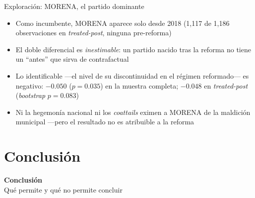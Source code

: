 \documentclass[
  aspectratio=43,        %
  t,                     %
  10pt                   %
]{beamer}
\begin{document}
\begin{frame}{Exploración: MORENA, el partido dominante}

  \begin{itemize}
    \item Como incumbente, MORENA aparece solo desde 2018
          (\textcolor{ITAMmaroon}{1{,}117 de 1{,}186} observaciones en
          \emph{treated-post}, ninguna pre-reforma)
    \item El doble diferencial es \emph{inestimable}: un partido nacido tras la
          reforma no tiene un ``antes'' que sirva de contrafactual
    \item Lo identificable —el nivel de su discontinuidad en el régimen
          reformado— es \textcolor{ITAMmaroon}{negativo}: $-0.050$ ($p=0.035$)
          en la muestra completa; $-0.048$ en \emph{treated-post}
          (\emph{bootstrap} $p=0.083$)
    \item Ni la hegemonía nacional ni los \emph{coattails} eximen a MORENA de la
          maldición municipal —pero el resultado no es atribuible a la reforma
  \end{itemize}

\end{frame}

\section{Conclusión}
{
\begin{frame}
  \vfill
  \begin{center}
    \textcolor{ITAMgreen}{\Large\bfseries Conclusión}\\[0.5em]
    \textcolor{ITAMgray}{\normalsize Qué permite y qué no permite concluir}
  \end{center}
  \vfill
\end{frame}
}
\end{document}
